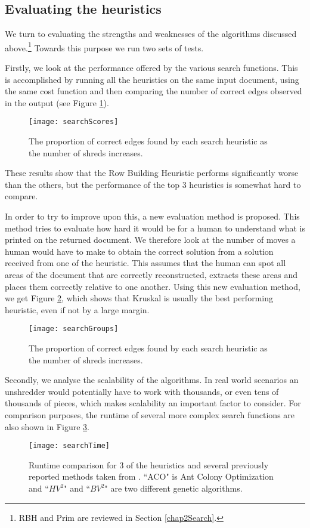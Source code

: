\subsection{Evaluating the heuristics}
\label{chap5Eval}
We turn to evaluating the strengths and weaknesses of the algorithms discussed above.\footnote{RBH and Prim are reviewed in Section \ref{chap2Search}.} Towards this purpose we run two sets of tests. 

Firstly, we look at the performance offered by the various search functions. This is accomplished by running all the heuristics on the same input document, using the same cost function and then comparing the number of correct edges observed in the output (see Figure \ref{fig:searchScore}). 
\begin{figure}[h]
  \centering
  \texttt{[image: searchScores]}
  \caption{The proportion of correct edges found by each search heuristic as the number of shreds increases.}
  \label{fig:searchScore}
\end{figure}
These results show that the Row Building Heuristic performs significantly worse than the others, but the performance of the top 3 heuristics is somewhat hard to compare. 

In order to try to improve upon this, a new evaluation method is proposed. This method tries to evaluate how hard it would be for a human to understand what is printed on the returned document. We therefore look at the number of moves a human would have to make to obtain the correct solution from a solution received from one of the heuristic. This assumes that the human can spot all areas of the document that are correctly reconstructed, extracts these areas and places them correctly relative to one another. Using this new evaluation method, we get Figure \ref{fig:searchGroups}, which shows that Kruskal is usually the best performing heuristic, even if not by a large margin.

\begin{figure}[h]
  \centering
  \texttt{[image: searchGroups]}
  \caption{The proportion of correct edges found by each search heuristic as the number of shreds increases.}
  \label{fig:searchGroups}
\end{figure}

Secondly, we analyse the scalability of the algorithms. In real world scenarios an unshredder would potentially have to work with thousands, or even tens of thousands of pieces, which makes scalability an important factor to consider. For comparison purposes, the runtime of several more complex search functions are also shown in Figure \ref{fig:searchTime}. 
\begin{figure}[h]
  \centering
  \texttt{[image: searchTime]}
  \caption{Runtime comparison for 3 of the heuristics and several previously reported methods taken from \cite{P2,P5,P7}. ``ACO" is Ant Colony Optimization and ``$HV^2$" and ``$BV^2$" are two different genetic algorithms. }
  \label{fig:searchTime}
\end{figure}

